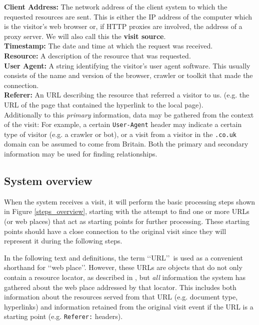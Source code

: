 \documentclass[a4paper]{danarticle}
\theoremstyle{remark}
\begin{document}
    \textbf{Client Address:} The network address of the client system to which 
    the requested resources are sent. This is either the IP address of the 
    computer which is the visitor's web browser or, if HTTP proxies are 
    involved, the address of a proxy server. We will also call this the 
    \textbf{visit source}.
    \\
    
    \textbf{Timestamp:} The date and time at which the request was received.
    \\
    
    \textbf{Resource:} A description of the resource that was requested.
    \\
    
    \textbf{User Agent:} A string identifying the visitor's user agent 
    software. This usually consists of the name and version of the browser, 
    crawler or toolkit that made the connection.
    \\
    
    \textbf{Referer:} An URL describing the resource that referred a visitor to
    us. (e.g. the URL of the page that contained the hyperlink to the 
    local page).
    \\
    
    Additionally to
    this \textit{primary} information, data may be gathered from the
    context of the visit: For example, a certain \verb$User-Agent$ header 
    may indicate a certain type of visitor (e.g. a crawler or bot), or a visit
    from a visitor in the \verb$.co.uk$ domain can be assumed to come from
    Britain. Both the primary and secondary information may be used for finding
    relationships.
    \subsection{System overview}
      When the system receives a visit, it will perform the basic processing
      steps shown in Figure \ref{steps_overview}, starting with the 
      attempt to find one or 
      more URLs (or web places) that act as starting points for further 
      processing. These 
      starting points should have a close connection to the original visit since 
      they will represent it during the following steps.
      
      In the following text and definitions, the term \lq\lq URL\rq\rq\ 
      is used as a convenient shorthand for \lq\lq web place\rq\rq . However, 
      these URLs are objects that 
      do not only contain a resource locator, as described 
      in \cite{url}, but \emph{all} information the system has gathered about 
      the web place addressed by that locator. This includes both information 
      about  the resources served from that URL (e.g. document type, hyperlinks) 
      and information retained from the original visit event if the URL is a 
      starting point (e.g. \verb$Referer:$ headers).
      
\end{document}
